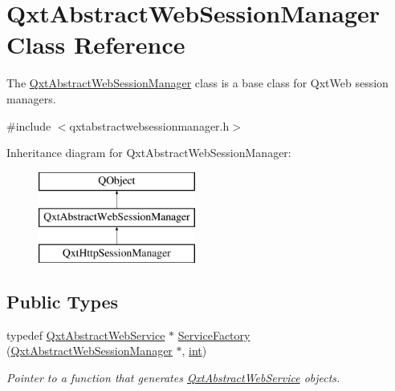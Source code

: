 \hypertarget{class_qxt_abstract_web_session_manager}{\section{Qxt\-Abstract\-Web\-Session\-Manager Class Reference}
\label{class_qxt_abstract_web_session_manager}
}


The \hyperlink{class_qxt_abstract_web_session_manager}{Qxt\-Abstract\-Web\-Session\-Manager} class is a base class for Qxt\-Web session managers.  




{\ttfamily \#include $<$qxtabstractwebsessionmanager.\-h$>$}

Inheritance diagram for Qxt\-Abstract\-Web\-Session\-Manager\-:\begin{figure}[H]
\begin{center}
\leavevmode
\includegraphics[height=3.000000cm]{class_qxt_abstract_web_session_manager}
\end{center}
\end{figure}
\subsection*{Public Types}
\begin{DoxyCompactItemize}
\item 
typedef \hyperlink{class_qxt_abstract_web_service}{Qxt\-Abstract\-Web\-Service} $\ast$ \hyperlink{class_qxt_abstract_web_session_manager_a7f507ee9b5b2c24ba2400258fa1a5f81}{Service\-Factory} (\hyperlink{class_qxt_abstract_web_session_manager}{Qxt\-Abstract\-Web\-Session\-Manager} $\ast$, \hyperlink{ioapi_8h_a787fa3cf048117ba7123753c1e74fcd6}{int})
\begin{DoxyCompactList}\small\item\em Pointer to a function that generates \hyperlink{class_qxt_abstract_web_service}{Qxt\-Abstract\-Web\-Service} objects. \end{DoxyCompactList}\end{DoxyCompactItemize}
